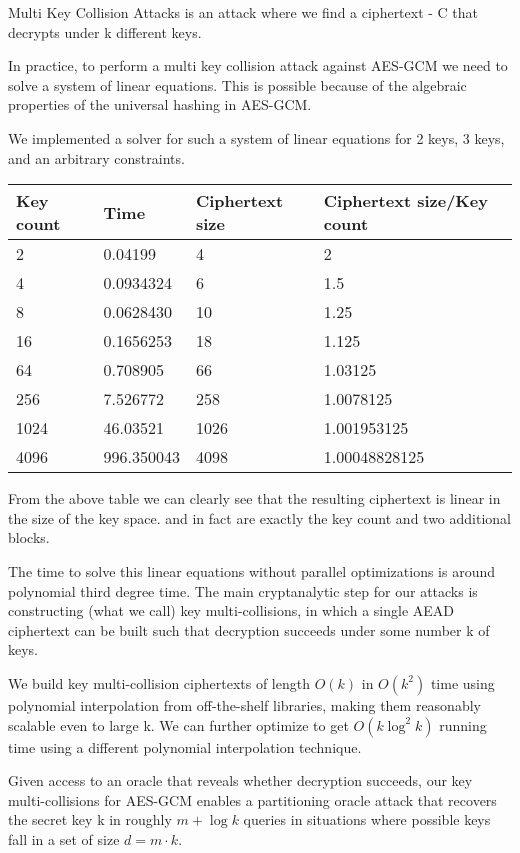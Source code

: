 Multi Key Collision Attacks is an attack where we find a ciphertext - C that decrypts under k different keys.

In practice, to perform a multi key collision attack against AES-GCM
we need to solve a system of linear equations.
This is possible because of the algebraic properties of the universal hashing in AES-GCM.

We implemented a solver for such a system of linear equations for 2 keys, 3 keys, and an arbitrary constraints.

\hfill \break

\begin{tabular}{ |p{3cm}||p{3cm}|p{3cm}|p{5cm}| }
    \hline
    Key count & Time       & Ciphertext size & Ciphertext size/Key count \\
    \hline
    2         & 0.04199    & 4               & 2                         \\
    4         & 0.0934324  & 6               & 1.5                       \\
    8         & 0.0628430  & 10              & 1.25                      \\
    16        & 0.1656253  & 18              & 1.125                     \\
    64        & 0.708905   & 66              & 1.03125                   \\
    256       & 7.526772   & 258             & 1.0078125                 \\
    1024      & 46.03521   & 1026            & 1.001953125               \\
    4096      & 996.350043 & 4098            & 1.00048828125             \\
    \hline
\end{tabular}

\hfill \break

From the above table we can clearly see that the resulting ciphertext is linear in the size of the key space.
and in fact are exactly the key count and two additional blocks.

The time to solve this linear equations without parallel optimizations is around polynomial third degree time.
The main cryptanalytic step for our attacks is constructing (what we call) key multi-collisions, in which a single
AEAD ciphertext can be built such that decryption succeeds under some number k of keys.

We build key multi-collision ciphertexts of length $O(k)$ in $O(k^2)$ time using polynomial
interpolation from off-the-shelf libraries, making them reasonably scalable even to large k.
We can further optimize to get $O(k \log^2 k)$ running time using a different
polynomial interpolation technique\cite{BORODIN1974366}.

Given access to an oracle that reveals whether decryption succeeds, our key multi-collisions
for AES-GCM enables a partitioning oracle attack that recovers the secret key k in
roughly $m + \log k $ queries in situations where possible keys fall in a set of size $d = m \cdot k$.